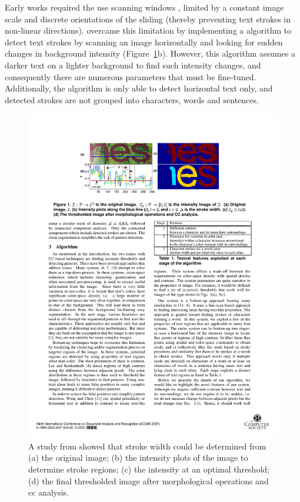 Early works required the use scanning windows \citep{XiangrongChen:2004ha, Lienhart:2002ub, Jung:2009do}, limited by a constant image scale and discrete orientations of the sliding (thereby preventing text strokes in non-linear directions). \citet{Subramanian:2007tf} overcame this limitation by implementing a algorithm to detect text strokes by scanning an image horizontally and looking for sudden changes in background intensity (Figure~\ref{fig:background:detection:cc:subramanian2007_intensity}b). However, this algorithm assumes a darker text on a lighter background to find such intensity changes, and consequently there are numerous parameters that must be fine-tuned. Additionally, the algorithm is only able to detect horizontal text only, and detected strokes are not grouped into characters, words and sentences.

\begin{figure}[h]
  \centering
  \includegraphics[width=\textwidth]{images/background/subramanian2007_intensity}
  \caption[Stroke analysis from \citet{Subramanian:2007tf}]{A study from \citet{Subramanian:2007tf} showed that stroke width could be determined from (a) the original image; (b) the intensity plots of the image to determine stroke regions; (c) the intensity at an optimal threshold; (d) the final thresholded image after morphological operations and \gls{cc} analysis.}
  \label{fig:background:detection:cc:subramanian2007_intensity}
\end{figure}

